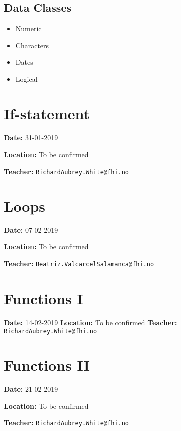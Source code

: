 \documentclass[12pt,]{article}
\providecommand{\tightlist}{%
  \setlength{\itemsep}{0pt}\setlength{\parskip}{0pt}}
\begin{document}
\subsection{Data Classes}\label{data-classes}

\begin{itemize}
\tightlist
\item
  Numeric
\item
  Characters
\item
  Dates
\item
  Logical
\end{itemize}

\section{If-statement}\label{if-statement}

\textbf{Date:} 31-01-2019

\textbf{Location:} To be confirmed

\textbf{Teacher:}
\href{mailto:RichardAubrey.White@fhi.no}{\nolinkurl{RichardAubrey.White@fhi.no}}

\section{Loops}\label{loops}

\textbf{Date:} 07-02-2019

\textbf{Location:} To be confirmed

\textbf{Teacher:}
\href{mailto:Beatriz.ValcarcelSalamanca@fhi.no}{\nolinkurl{Beatriz.ValcarcelSalamanca@fhi.no}}

\section{Functions I}\label{functions-i}

\textbf{Date:} 14-02-2019 \textbf{Location:} To be confirmed
\textbf{Teacher:}
\href{mailto:RichardAubrey.White@fhi.no}{\nolinkurl{RichardAubrey.White@fhi.no}}

\section{Functions II}\label{functions-ii}

\textbf{Date:} 21-02-2019

\textbf{Location:} To be confirmed

\textbf{Teacher:}
\href{mailto:RichardAubrey.White@fhi.no}{\nolinkurl{RichardAubrey.White@fhi.no}}


\end{document}
